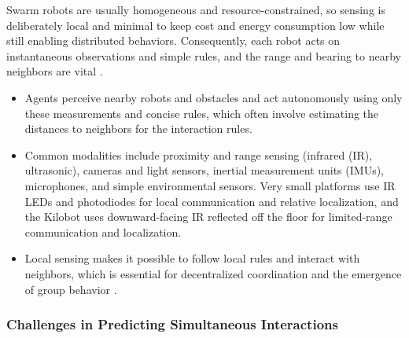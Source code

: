 Swarm robots are usually homogeneous and resource-constrained, so sensing is
deliberately local and minimal to keep cost and energy consumption low while
still enabling distributed behaviors. Consequently, each robot acts on
instantaneous observations and simple rules, and the range and bearing to nearby
neighbors are vital \cite{dias2021swarm}.
\begin{itemize}
  \item {} Agents perceive nearby robots and
        obstacles and act autonomously using only these measurements and concise
        rules, which often involve estimating the distances to neighbors for the
        interaction rules.
  \item {} Common modalities include proximity and range sensing
        (infrared (IR), ultrasonic), cameras and light sensors, inertial
        measurement units (IMUs), microphones, and simple environmental sensors.
        Very small platforms use IR LEDs and photodiodes for local communication
        and relative localization, and the Kilobot uses downward-facing IR
        reflected off the floor for limited-range communication and localization.
  \item {} Local sensing makes it possible to follow local rules and
        interact with neighbors, which is essential for decentralized
        coordination and the emergence of group behavior \cite{hamann2018swarm}.
\end{itemize}

\subsubsection{Challenges in Predicting Simultaneous Interactions}

